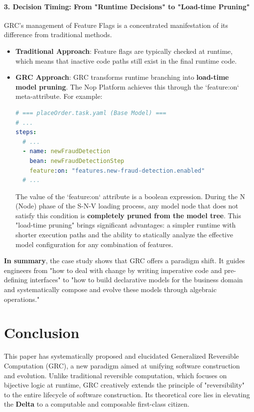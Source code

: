 \documentclass[11pt]{article}
\begin{document}
\paragraph{3. Decision Timing: From "Runtime Decisions" to "Load-time Pruning"}
GRC's management of Feature Flags is a concentrated manifestation of its difference from traditional methods.
\begin{itemize}
    \item \textbf{Traditional Approach}: Feature flags are typically checked at runtime, which means that inactive code paths still exist in the final runtime code.
    \item \textbf{GRC Approach}: GRC transforms runtime branching into \textbf{load-time model pruning}. The Nop Platform achieves this through the `feature:on` meta-attribute. For example:
    \begin{lstlisting}[language=YAML, caption={Declarative Feature Toggle in a GRC Model}]
# === placeOrder.task.yaml (Base Model) ===
# ...
steps:
  # ...
  - name: newFraudDetection
    bean: newFraudDetectionStep
    feature:on: "features.new-fraud-detection.enabled"
  # ...
    \end{lstlisting}
    The value of the `feature:on` attribute is a boolean expression. During the N (Node) phase of the S-N-V loading process, any model node that does not satisfy this condition is \textbf{completely pruned from the model tree}. This "load-time pruning" brings significant advantages: a simpler runtime with shorter execution paths and the ability to statically analyze the effective model configuration for any combination of features.
\end{itemize}

\textbf{In summary}, the case study shows that GRC offers a paradigm shift. It guides engineers from "how to deal with change by writing imperative code and pre-defining interfaces" to "how to build declarative models for the business domain and systematically compose and evolve these models through algebraic operations."

\section{Conclusion}

This paper has systematically proposed and elucidated Generalized Reversible Computation (GRC), a new paradigm aimed at unifying software construction and evolution. Unlike traditional reversible computation, which focuses on bijective logic at runtime, GRC creatively extends the principle of "reversibility" to the entire lifecycle of software construction. Its theoretical core lies in elevating the \textbf{Delta} to a computable and composable first-class citizen.
\end{document}
